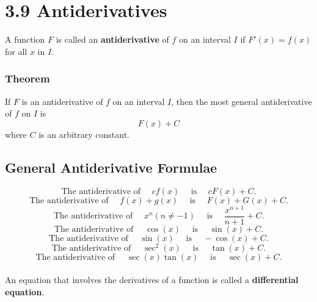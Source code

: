 %
%

\section*{3.9 Antiderivatives}

A function \(F\) is called an \textbf{antiderivative} of \(f\) on an interval \(I\) if \(F'(x)=f(x)\) for all \(x\) in \(I\).

\subsubsection*{Theorem}

If \(F\) is an antiderivative of \(f\) on an interval \(I\), then the most general antiderivative of \(f\) on \(I\) is 
$$ F(x) + C $$
where \(C\) is an arbitrary constant.

\subsection*{General Antiderivative Formulae}

$$ \text{The antiderivative of } \quad cf(x) \quad \text{ is } \quad cF(x) + C. $$
$$ \text{The antiderivative of } \quad f(x)+g(x) \quad \text{ is } \quad F(x) + G(x) + C. $$
$$ \text{The antiderivative of } \quad x^{n} (n \neq -1) \quad \text{ is } \quad \frac{x^{n+1}}{n+1} + C. $$
$$ \text{The antiderivative of } \quad \cos(x) \quad \text{ is } \quad \sin(x) + C. $$
$$ \text{The antiderivative of } \quad \sin(x) \quad \text{ is } \quad -\cos(x) + C. $$
$$ \text{The antiderivative of } \quad \sec^2(x) \quad \text{ is } \quad \tan(x) + C. $$
$$ \text{The antiderivative of } \quad \sec(x)\tan(x) \quad \text{ is } \quad \sec(x) + C. $$
\\
An equation that involves the derivatives of a function is called a \textbf{differential equation}.
